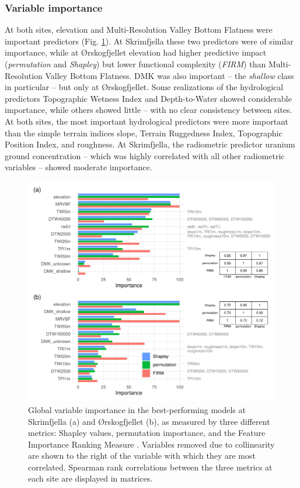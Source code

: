 \documentclass[soil, manuscript]{copernicus}
\begin{document}
\subsubsection{Variable importance}

At both sites, elevation and Multi-Resolution Valley Bottom Flatness were important predictors (Fig. \ref{fig:varImp}).
At Skrimfjella these two predictors were of similar importance, while at Ørskogfjellet elevation had higher predictive impact (\emph{permutation} and \emph{Shapley}) but lower functional complexity (\emph{FIRM}) than Multi-Resolution Valley Bottom Flatness.
DMK was also important -- the \emph{shallow} class in particular -- but only at Ørskogfjellet.
Some realizations of the hydrological predictors Topographic Wetness Index and Depth-to-Water showed considerable importance, while others showed little -- with no clear consistency between sites.
At both sites, the most important hydrological predictors were more important than the simple terrain indices slope, Terrain Ruggedness Index, Topographic Position Index, and roughness.
At Skrimfjella, the radiometric predictor uranium ground concentration -- which was highly correlated with all other radiometric variables -- showed moderate importance.

\begin{figure}
\includegraphics[width=1\linewidth]{figures/variable_importance} \caption{Global variable importance in the best-performing models at Skrimfjella (a) and Ørskogfjellet (b), as measured by three different metrics: Shapley values, permutation importance, and the Feature Importance Ranking Measure \citep{greenwellVariableImportancePlots2020}. Variables removed due to collinearity are shown to the right of the variable with which they are most correlated. Spearman rank correlations between the three metrics at each site are displayed in matrices.}\label{fig:varImp}
\end{figure}
\end{document}
